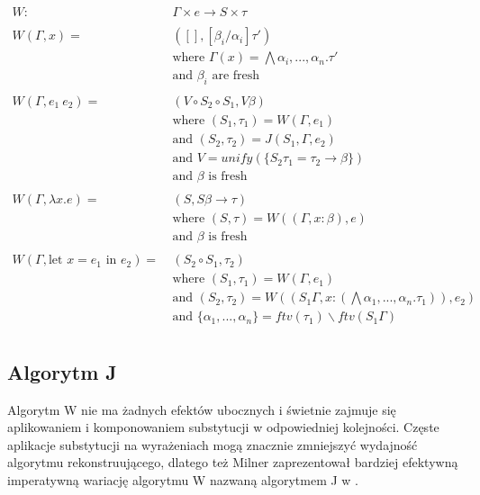 \documentclass{article}
\begin{document}
\begin{equation}
  \begin{split}
    W :&\ \Gamma\times e \rightarrow S\times\tau \\
    \\
    W(\Gamma,x) =&\  ([],[\beta_i/\alpha_i]\tau') \\
    &\ \text{where } \Gamma(x) = \bigwedge\alpha_i,...,\alpha_n.\tau' \\
    &\ \text{and } \beta_i \text{ are fresh} \\
    \\
    W(\Gamma,e_1\ e_2) =&\  (V\circ S_2\circ S_1,V\beta) \\
    &\ \text{where } (S_1,\tau_1) = W(\Gamma,e_1) \\
    &\ \text{and } (S_2,\tau_2)=J(S_1,\Gamma,e_2) \\
    &\ \text{and } V = unify(\{S_2\tau_1=\tau_2\rightarrow\beta\}) \\
    &\ \text{and } \beta \text{ is fresh} \\
    \\
    W(\Gamma,\lambda x.e) =&\  (S,S\beta\rightarrow\tau) \\
    &\ \text{where } (S,\tau)=W((\Gamma,x:\beta),e) \\
    &\ \text{and } \beta \text{ is fresh} \\
    \\
    W(\Gamma,\text{let }x=e_1\text{ in }e_2) =&\  (S_2\circ S_1,\tau_2) \\
    &\ \text{where } (S_1,\tau_1)=W(\Gamma,e_1) \\
    &\ \text{and } (S_2,\tau_2)=W((S_1\Gamma,x:(\bigwedge\alpha_1,...,\alpha_n.\tau_1)),e_2) \\
    &\ \text{and } \{\alpha_1,...,\alpha_n\}=ftv(\tau_1)\backslash ftv(S_1\Gamma) \\
  \end{split}
\end{equation}

\subsection{Algorytm J}
Algorytm W nie ma żadnych efektów ubocznych i świetnie zajmuje się aplikowaniem i komponowaniem substytucji w odpowiedniej kolejności. Częste aplikacje substytucji na wyrażeniach mogą znacznie zmniejszyć wydajność algorytmu rekonstruującego, dlatego też Milner zaprezentował bardziej efektywną imperatywną wariację algorytmu W nazwaną algorytmem J w \cite{Milner__1978}.
\end{document}
